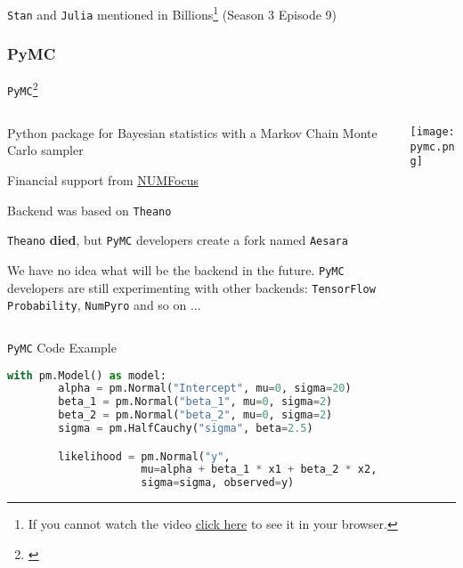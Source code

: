 \begin{frame}{\texttt{Stan} and \texttt{Julia} mentioned in Billions\footnote{
			If you cannot watch the video \href{https://github.com/storopoli/Bayesian-Statistics/blob/main/images/stan_billions_subtitled.mp4?raw=true}{click here}
			to see it in your browser.} (Season 3 Episode 9)}
	\centering
\end{frame}

\subsubsection{PyMC}
\begin{frame}{\texttt{PyMC}\footnote{\textcite{pymc3}}}
	\begin{columns}
		\begin{column}{0.8\textwidth}
			\begin{vfilleditems}
				\small
				\item Python package for Bayesian statistics
				with a Markov Chain Monte Carlo sampler
				\item Financial support from \href{https://numfocus.org/}{NUMFocus}
				\item Backend was based on \texttt{Theano}
				\item \texttt{Theano} \textbf{died}, but \texttt{PyMC} developers create a fork
				named \texttt{Aesara}
				\item We have no idea what will be the backend in
				the future.
				\texttt{PyMC} developers are still experimenting with other
				backends: \texttt{TensorFlow Probability}, \texttt{NumPyro}
				and so on ...
			\end{vfilleditems}
		\end{column}
		\begin{column}{0.2\textwidth}
			\centering
			\texttt{[image: pymc.png]}
		\end{column}
	\end{columns}
\end{frame}

\begin{frame}[fragile]{\texttt{PyMC} Code Example}
	\begin{lstlisting}[basicstyle=\small, language=Python]
    with pm.Model() as model:
        alpha = pm.Normal("Intercept", mu=0, sigma=20)
        beta_1 = pm.Normal("beta_1", mu=0, sigma=2)
        beta_2 = pm.Normal("beta_2", mu=0, sigma=2)
        sigma = pm.HalfCauchy("sigma", beta=2.5)

        likelihood = pm.Normal("y",
                     mu=alpha + beta_1 * x1 + beta_2 * x2,
                     sigma=sigma, observed=y)
\end{lstlisting}
\end{frame}

